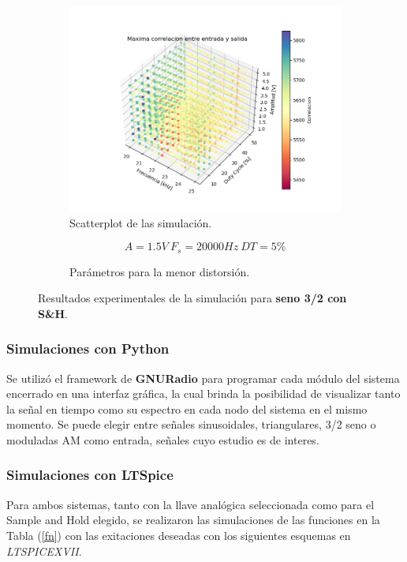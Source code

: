 \begin{figure}[H]
\centering
\begin{subfigure}{\linewidth}
\includegraphics[width=\linewidth]{ImagenesEjercicio6/scatter_sh_sen32.png}
\caption{Scatterplot de las simulación.}
\end{subfigure}

\begin{subfigure}{\linewidth}
\[A = 1.5V \ F_s = 20000Hz \ DT = 5\%\]
\caption{Parámetros para la menor distorsión.}
\end{subfigure}
\label{sen32_sh}
\caption{Resultados experimentales de la simulación para \textbf{seno 3/2 con S\&H}.}
\end{figure}

\subsubsection{Simulaciones con Python}
Se utilizó el framework de \textbf{GNURadio} para programar cada módulo del sistema encerrado en una interfaz gráfica, la cual brinda la posibilidad de visualizar tanto la señal en tiempo como su espectro en cada nodo del sistema en el mismo momento. Se puede elegir entre señales sinusoidales, triangulares, 3/2 seno o moduladas AM como entrada, señales cuyo estudio es de interes.

\subsubsection{Simulaciones con LTSpice}
Para ambos sistemas, tanto con la llave analógica seleccionada como para el Sample and Hold elegido, se realizaron las simulaciones de las funciones en la Tabla (\ref{fn}) con las exitaciones deseadas con los siguientes esquemas en \textit{LTSPICEXVII}.

